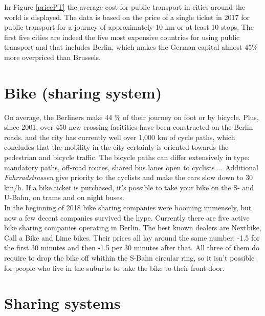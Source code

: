 In Figure \ref{pricePT} the average cost for public transport in cities around the world is displayed. The data is based on the price of a single ticket in 2017 for public transport for a journey of approximately 10 km or at least 10 stops. The first five cities are indeed the five most expensive countries for using public transport and that includes Berlin, which makes the German capital almost 45\% more overpriced than Brussels.


\section{Bike (sharing system)}

On average, the Berliners make 44 \% of their journey on foot or by bicycle. Plus, since 2001, over 450 new crossing facitities have been constructed on the Berlin roads. and the city has currently well over 1,000 km of cycle paths, which concludes that the mobility in the city certainly is oriented towards the pedestrian and bicycle traffic. The bicycle paths can differ extensively in type: mandatory paths, off-road routes, shared bus lanes open to cyclists ... Additional \textit{Fahrradstrassen} give priority to the cyclists and make the cars slow down to 30 km/h. If a bike ticket is purchased, it's possible to take your bike on the S- and U-Bahn, on trams and on night buses\cite{MobilityCity}\cite{cycling}. \\

In the beginning of 2018 bike sharing companies were booming immensely, but now a few decent companies survived the hype. Currently there are five active bike sharing companies operating in Berlin. The best known dealers are Nextbike, Call a Bike and Lime bikes. Their prices all lay around the same number: -1.5 for the first 30 minutes and then -1.5 per 30 minutes after that. All three of them do require to drop the bike off whithin the S-Bahn circular ring, so it isn't possible for people who live in the suburbs to take the bike to their front door\cite{bikeshare}.


\section{Sharing systems}

